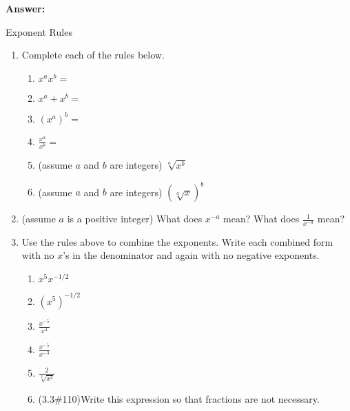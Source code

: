\documentclass[11pt,fleqn]{article}
\begin{document}


\textbf{Answer:} \\ \vfill

\vspace{2in}

\hrulefill

Exponent Rules

\begin{enumerate}
\item Complete each of the rules below.\\ \vfill
	\begin{enumerate}
	\item $x^ax^b=$\\ \vfill
	\item $x^a+x^b=$\\ \vfill 
	\item $(x^a)^b=$\\ \vfill
	\item $\frac{x^a}{x^b}=$\\ \vfill
	\item (assume $a$ and $b$ are integers) $\sqrt[a]{x^b}$\\ \vfill
	\item (assume $a$ and $b$ are integers) $(\sqrt[a]{x})^b$\\ \vfill
	\end{enumerate}
\item (assume $a$ is a positive integer) What does ${x^{-a}}$ mean? What does $\frac{1}{x^{-a}}$ mean? \\ \vfill

\vspace{1in}

\item Use the rules above to combine the exponents. Write each combined form with no $x$'s in the denominator and again with no negative exponents.
	\begin{enumerate}
	\item $x^{5}x^{-1/2}$\\ \vfill
	
	\item $(x^{5})^{-1/2}$\\ \vfill
	\item $\frac{x^{-5}}{x^{4}}$\\ \vfill
	\item $\frac{x^{-5}}{x^{-3}}$\\ \vfill
	\item $\frac{2}{\sqrt[3]{x^2}}$\\ \vfill
	\item (3.3\#110)Write this expression so that fractions are not necessary.\\ \vfill 
	

\end{enumerate}
\end{enumerate}
\end{document}
